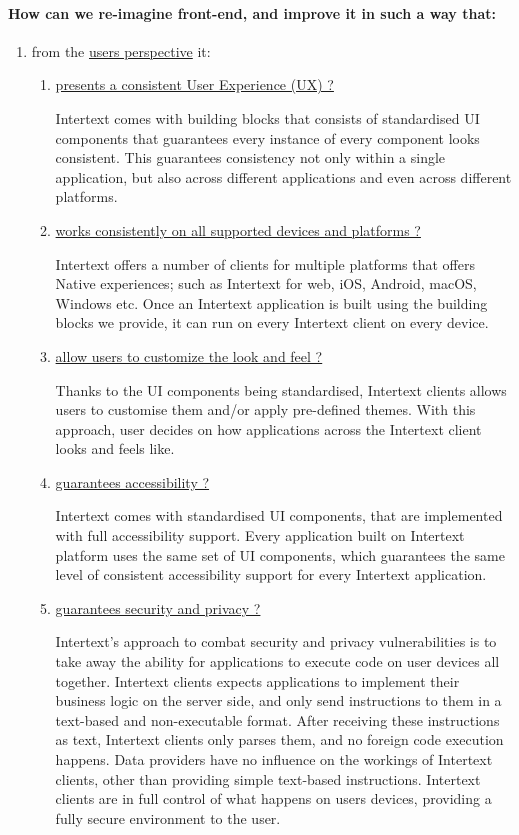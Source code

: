 \paragraph{How can we re-imagine front-end, and improve it in such a way that:}
\begin{enumerate}
  \item from the \underline{users perspective} it:
  \begin{enumerate}
    \item \underline{presents a consistent User Experience (UX) ?}
    
    Intertext comes with building blocks that consists of standardised UI components that guarantees every instance of every component looks consistent. This guarantees consistency not only within a single application, but also across different applications and even across different platforms.
    
    \item \underline{works consistently on all supported devices and platforms ?}

    Intertext offers a number of clients for multiple platforms that offers Native experiences; such as Intertext for web, iOS, Android, macOS, Windows etc. Once an Intertext application is built using the building blocks we provide, it can run on every Intertext client on every device.
    
    \item \underline{allow users to customize the look and feel ?}
    
    Thanks to the UI components being standardised, Intertext clients allows users to customise them and/or apply pre-defined themes. With this approach, user decides on how applications across the Intertext client looks and feels like.
    
    \item \underline{guarantees accessibility ?}

    Intertext comes with standardised UI components, that are implemented with full accessibility support. Every application built on Intertext platform uses the same set of UI components, which guarantees the same level of consistent accessibility support for every Intertext application.

    \item \underline{guarantees security and privacy ?}

    Intertext's approach to combat security and privacy vulnerabilities is to take away the ability for applications to execute code on user devices all together. Intertext clients expects applications to implement their business logic on the server side, and only send instructions to them in a text-based and non-executable format. After receiving these instructions as text, Intertext clients only parses them, and no foreign code execution happens. Data providers have no influence on the workings of Intertext clients, other than providing simple text-based instructions. Intertext clients are in full control of what happens on users devices, providing a fully secure environment to the user.
    

\end{enumerate}
\end{enumerate}
